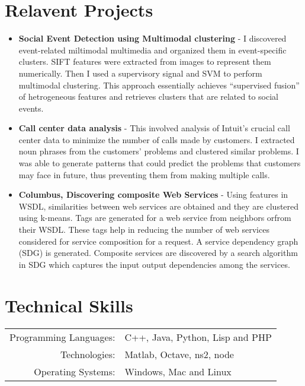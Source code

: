 \documentclass[a4paper,10pt]{article} %
\begin{document}
\section{Relavent Projects}
\begin{itemize}
 \item \textbf{Social Event Detection using Multimodal clustering} - I discovered event-related miltimodal multimedia and organized them in event-specific clusters. SIFT features were extracted from images to represent them numerically. Then I used a supervisory signal and SVM to perform multimodal clustering. This approach essentially achieves “supervised fusion” of hetrogeneous features and retrieves clusters that are related to social events.
 \item \textbf{Call center data analysis} - This involved analysis of Intuit's crucial call center data to minimize the number of calls made by customers. I extracted noun phrases from the customers’ problems and clustered similar problems. I was able to generate patterns that could predict the problems that customers may face in future, thus preventing them from making multiple calls.
 \item \textbf{Columbus, Discovering composite Web Services} - Using features in WSDL, similarities between web services are obtained and they are clustered using k-means. Tags are generated for a web service from neighbors orfrom their WSDL. These tags help in reducing the number of web services considered for service composition for a request. A service dependency graph (SDG) is generated. Composite services are discovered by a search algorithm in SDG which captures the input output dependencies among the services.
\end{itemize}


\section{Technical Skills}
\renewcommand{\arraystretch}{1}%
\begin{tabular}{rl}

Programming Languages: &  C++, Java, Python, Lisp and PHP\\
Technologies: & Matlab, Octave, ns2, node \\
Operating Systems: & Windows, Mac and Linux

\end{tabular}
\end{document}
